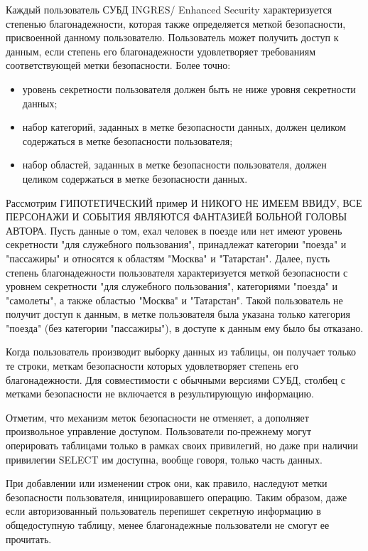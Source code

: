 Каждый пользователь СУБД INGRES/ Enhanced Security характеризуется степенью благонадежности,
которая также определяется меткой безопасности, присвоенной данному пользователю. Пользователь
может получить доступ к данным, если степень его благонадежности удовлетворяет требованиям
соответствующей метки безопасности. Более точно:
\begin{itemize}
    \item уровень секретности пользователя должен быть не ниже уровня секретности данных;
    \item набор категорий, заданных в метке безопасности данных, должен целиком содержаться в метке
        безопасности пользователя;
    \item набор областей, заданных в метке безопасности пользователя, должен целиком содержаться в
        метке безопасности данных.
\end{itemize}

Рассмотрим ГИПОТЕТИЧЕСКИЙ пример И НИКОГО НЕ ИМЕЕМ ВВИДУ, ВСЕ ПЕРСОНАЖИ И СОБЫТИЯ ЯВЛЯЮТСЯ
ФАНТАЗИЕЙ БОЛЬНОЙ ГОЛОВЫ АВТОРА. Пусть данные о том, ехал человек в поезде или нет имеют уровень
секретности "для служебного пользования", принадлежат категории "поезда" и "пассажиры" и относятся
к областям "Москва" и "Татарстан". Далее, пусть степень благонадежности пользователя
характеризуется меткой безопасности с уровнем секретности "для служебного пользования", категориями
"поезда" и "самолеты", а также областью "Москва" и "Татарстан". Такой пользователь не получит
доступ к данным, в метке пользователя была указана только категория "поезда" (без категории
"пассажиры"), в доступе к данным ему было бы отказано.

Когда пользователь производит выборку данных из таблицы, он получает только те строки, меткам
безопасности которых удовлетворяет степень его благонадежности. Для совместимости с обычными
версиями СУБД, столбец с метками безопасности не включается в результирующую информацию.

Отметим, что механизм меток безопасности не отменяет, а дополняет произвольное управление доступом.
Пользователи по-прежнему могут оперировать таблицами только в рамках своих привилегий, но даже при
наличии привилегии SELECT им доступна, вообще говоря, только часть данных.

При добавлении или изменении строк они, как правило, наследуют метки безопасности пользователя,
инициировавшего операцию. Таким образом, даже если авторизованный пользователь перепишет секретную
информацию в общедоступную таблицу, менее благонадежные пользователи не смогут ее прочитать.

